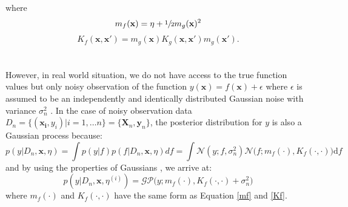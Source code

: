 \documentclass[a4paper,11pt]{report}
\begin{document}
where
         \begin{equation} \label{mf}
	 m_f (\mathbf{x}) = \eta + \sfrac{1}{2}m_g(\mathbf{x})^2 
	\end{equation}
	\begin{equation} \label{Kf}
	K_f (\mathbf{x},\mathbf{x}') = m_g(\mathbf{x})K_g (\mathbf{x},\mathbf{x}') m_g(\mathbf{x}').
      	 \end{equation} 
\\\\
However, in real world situation, we do not have access to the true function values but only noisy observation of the function $ y(\mathbf{x}) = f(\mathbf{x}) +  \epsilon $ where $\epsilon$ is assumed to be an independently and identically distributed Gaussian noise with variance $\sigma_n^2$ \cite{rasmussen2006gaussian}.  In the case of noisy observation data $D_n=\{(\mathbf{x_{i}},y_{i}) \vert i=1, \dots n\}=\{ \mathbf{X}_n,\mathbf{y}_n\}$, the posterior distribution for $y$ is also a Gaussian process because:
 	\begin{equation}
 	 p(y \vert D_n,\mathbf{x},\eta )= \int p(y \vert f) p(f \vert D_n,\mathbf{x},\eta ) df = \int \mathcal{N} (y; f, \sigma_n^2 ) \mathcal{N} \big(f; m_{f} (\cdot), K_{f} (\cdot,\cdot) \big) \mathrm{d} f
	\end{equation}
\noindent
and by using the properties of Gaussians \cite{bishop2006pattern}, we arrive at: 
 	\begin{equation} \label{posteriory}
	p(y \vert D_n,\mathbf{x},\eta^{(i)})=\mathcal{GP} \big(y; m_{f} (\cdot), K_{f} (\cdot,\cdot)+\sigma_n^2 \big) 
 	\end{equation}
where $m_{f} (\cdot)$ and $K_{f} (\cdot,\cdot)$ have the same form as Equation \ref{mf} and \ref{Kf}.

\end{document}
